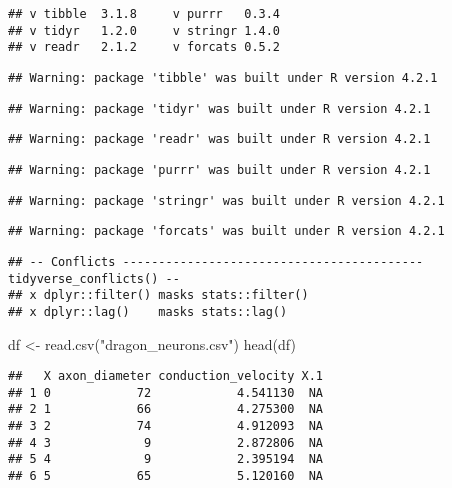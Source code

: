 \documentclass[
]{article}
\newenvironment{Shaded}{\begin{snugshade}}{\end{snugshade}}
\newcommand{\FunctionTok}[1]{\textcolor[rgb]{0.00,0.00,0.00}{#1}}
\newcommand{\NormalTok}[1]{#1}
\newcommand{\OtherTok}[1]{\textcolor[rgb]{0.56,0.35,0.01}{#1}}
\newcommand{\StringTok}[1]{\textcolor[rgb]{0.31,0.60,0.02}{#1}}
\begin{document}
\begin{verbatim}
## v tibble  3.1.8     v purrr   0.3.4
## v tidyr   1.2.0     v stringr 1.4.0
## v readr   2.1.2     v forcats 0.5.2
\end{verbatim}

\begin{verbatim}
## Warning: package 'tibble' was built under R version 4.2.1
\end{verbatim}

\begin{verbatim}
## Warning: package 'tidyr' was built under R version 4.2.1
\end{verbatim}

\begin{verbatim}
## Warning: package 'readr' was built under R version 4.2.1
\end{verbatim}

\begin{verbatim}
## Warning: package 'purrr' was built under R version 4.2.1
\end{verbatim}

\begin{verbatim}
## Warning: package 'stringr' was built under R version 4.2.1
\end{verbatim}

\begin{verbatim}
## Warning: package 'forcats' was built under R version 4.2.1
\end{verbatim}

\begin{verbatim}
## -- Conflicts ------------------------------------------ tidyverse_conflicts() --
## x dplyr::filter() masks stats::filter()
## x dplyr::lag()    masks stats::lag()
\end{verbatim}

\begin{Shaded}
\begin{Highlighting}[]
\NormalTok{df }\OtherTok{\textless{}{-}} \FunctionTok{read.csv}\NormalTok{(}\StringTok{"dragon\_neurons.csv"}\NormalTok{)}
\FunctionTok{head}\NormalTok{(df)}
\end{Highlighting}
\end{Shaded}

\begin{verbatim}
##   X axon_diameter conduction_velocity X.1
## 1 0            72            4.541130  NA
## 2 1            66            4.275300  NA
## 3 2            74            4.912093  NA
## 4 3             9            2.872806  NA
## 5 4             9            2.395194  NA
## 6 5            65            5.120160  NA
\end{verbatim}
\end{document}

